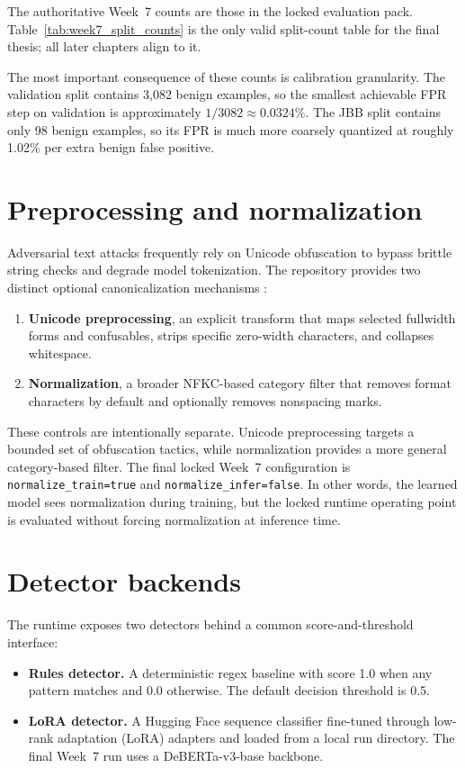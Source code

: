 The authoritative Week~7 counts are those in the locked evaluation pack. Table~\ref{tab:week7_split_counts} is the only valid split-count table for the final thesis; all later chapters align to it.



The most important consequence of these counts is calibration granularity. The validation split contains 3,082 benign examples, so the smallest achievable FPR step on validation is approximately $1/3082 \approx 0.0324\%$. The JBB split contains only 98 benign examples, so its FPR is much more coarsely quantized at roughly 1.02\% per extra benign false positive.

\section{Preprocessing and normalization}

Adversarial text attacks frequently rely on Unicode obfuscation to bypass brittle string checks and degrade model tokenization. The repository provides two distinct optional canonicalization mechanisms \cite{boucher2023trojansource,unicode_uax15,unicode_uts39}:
\begin{enumerate}
  \item \textbf{Unicode preprocessing}, an explicit transform that maps selected fullwidth forms and confusables, strips specific zero-width characters, and collapses whitespace.
  \item \textbf{Normalization}, a broader NFKC-based category filter that removes format characters by default and optionally removes nonspacing marks.
\end{enumerate}

These controls are intentionally separate. Unicode preprocessing targets a bounded set of obfuscation tactics, while normalization provides a more general category-based filter. The final locked Week~7 configuration is \texttt{normalize\_train=true} and \texttt{normalize\_infer=false}. In other words, the learned model sees normalization during training, but the locked runtime operating point is evaluated without forcing normalization at inference time.

\section{Detector backends}

The runtime exposes two detectors behind a common score-and-threshold interface:
\begin{itemize}
  \item \textbf{Rules detector.} A deterministic regex baseline with score 1.0 when any pattern matches and 0.0 otherwise. The default decision threshold is 0.5.
  \item \textbf{LoRA detector.} A Hugging Face sequence classifier fine-tuned through low-rank adaptation (LoRA) adapters and loaded from a local run directory. The final Week~7 run uses a DeBERTa-v3-base backbone.
\end{itemize}

